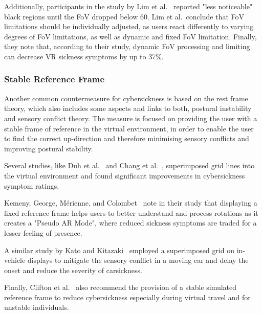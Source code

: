 Additionally, participants in the study by Lim et al.~\cite{Lim2020} reported "less noticeable" black regions until
the FoV dropped below 60\textdegree.
Lim et al.\ conclude that FoV limitations should be individually adjusted, as users react differently to varying
degrees of FoV limitations, as well as dynamic and fixed FoV limitation.
Finally, they note that, according to their study, dynamic FoV processing and limiting can decrease VR sickness
symptoms by up to 37\%.


\subsubsection{Stable Reference Frame}\label{subsubsec:stable-reference-frame}

Another common countermeasure for cybersickness is based on the rest frame theory, which also includes some aspects and
links to both, postural instability and sensory conflict theory.
The measure is focused on providing the user with a stable frame of reference in the virtual environment, in order
to enable the user to find the correct up-direction and therefore minimising sensory conflicts and improving postural
stability.

Several studies, like Duh et al.~\cite{Duh2001b} and Chang et al.~\cite{Chang2013}, superimposed grid lines into the
virtual environment and found significant improvements in cybersickness symptom ratings.

Kemeny, George, M\'erienne, and Colombet~\cite{Kemeny2017} note in their study that displaying a fixed reference
frame helps users to better understand and process rotations as it creates a "Pseudo AR Mode", where reduced sickness
symptoms are traded for a lesser feeling of presence.

A similar study by Kato and Kitazaki~\cite{Kato2008} employed a superimposed grid on in-vehicle displays to mitigate
the sensory conflict in a moving car and delay the onset and reduce the severity of carsickness.

Finally, Clifton et al.~\cite{Clifton2020} also recommend the provision of a stable simulated reference frame to
reduce cybersickness especially during virtual travel and for unstable individuals.
